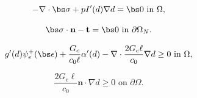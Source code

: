 \bigskip
\noindent
\begin{mdframed}[
    frametitle={\begin{equation}\label{uvc}\tag{UVC}\text{Unloaded Virtual Crack Formulation}\end{equation}},
    frametitlebackgroundcolor=gray!20,
    backgroundcolor=gray!5,
    linewidth=0pt,
    nobreak=true
  ]
  
\begin{equation}\label{disp equation box}
    -\nabla \cdot \bs\sigma  + pI'(d) \nabla d = \bs 0 \text{ in }\Omega,
\end{equation}

\begin{equation}\label{disp bcs box}
    \bs\sigma\cdot \textbf{n} -\textbf{t} = \bs 0 \text{ in }\partial\Omega_N.
\end{equation}

\begin{equation}\label{damage equation box}
    g'(d) \psi_e^+(\bs\epsilon)
    + \dfrac{G_c}{c_0\ell}\alpha'(d) - \nabla \cdot \dfrac{2G_c\ell}{c_0}\nabla d \ge 0 \text{ in }\Omega,
\end{equation}

\begin{equation}\label{damage bcs box}
    \dfrac{2G_c\ell}{c_0}\textbf{n}\cdot \nabla d \ge 0 \text{ on }\partial\Omega.
\end{equation}
  
\end{mdframed}
\hspace{.03\linewidth}
